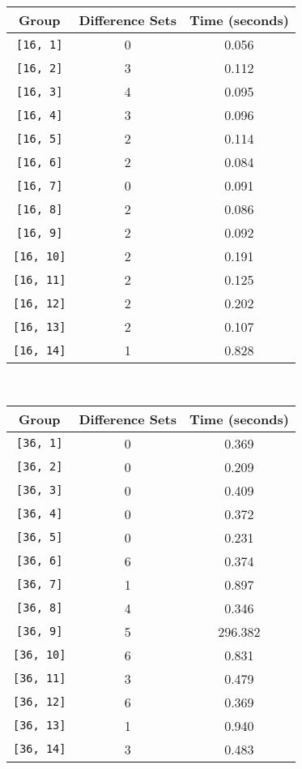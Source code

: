 \documentclass[a4paper,11pt]{report}
\begin{document}
{{ \begin{center}
\begin{tabular}{ccc}Group&
Difference Sets&
Time (seconds)\\
\hline
\texttt{[16, 1]}&
0&
0.056\\
\texttt{[16, 2]}&
3&
0.112\\
\texttt{[16, 3]}&
4&
0.095\\
\texttt{[16, 4]}&
3&
0.096\\
\texttt{[16, 5]}&
2&
0.114\\
\texttt{[16, 6]}&
2&
0.084\\
\texttt{[16, 7]}&
0&
0.091\\
\texttt{[16, 8]}&
2&
0.086\\
\texttt{[16, 9]}&
2&
0.092\\
\texttt{[16, 10]}&
2&
0.191\\
\texttt{[16, 11]}&
2&
0.125\\
\texttt{[16, 12]}&
2&
0.202\\
\texttt{[16, 13]}&
2&
0.107\\
\texttt{[16, 14]}&
1&
0.828\\
\end{tabular}\\[2mm]
\end{center}

 \begin{center}
\begin{tabular}{ccc}Group&
Difference Sets&
Time (seconds)\\
\hline
\texttt{[36, 1]}&
0&
0.369\\
\texttt{[36, 2]}&
0&
0.209\\
\texttt{[36, 3]}&
0&
0.409\\
\texttt{[36, 4]}&
0&
0.372\\
\texttt{[36, 5]}&
0&
0.231\\
\texttt{[36, 6]}&
6&
0.374\\
\texttt{[36, 7]}&
1&
0.897\\
\texttt{[36, 8]}&
4&
0.346\\
\texttt{[36, 9]}&
5&
296.382\\
\texttt{[36, 10]}&
6&
0.831\\
\texttt{[36, 11]}&
3&
0.479\\
\texttt{[36, 12]}&
6&
0.369\\
\texttt{[36, 13]}&
1&
0.940\\
\texttt{[36, 14]}&
3&
0.483\\
\end{tabular}\\[2mm]
\end{center}

}}
\end{document}
